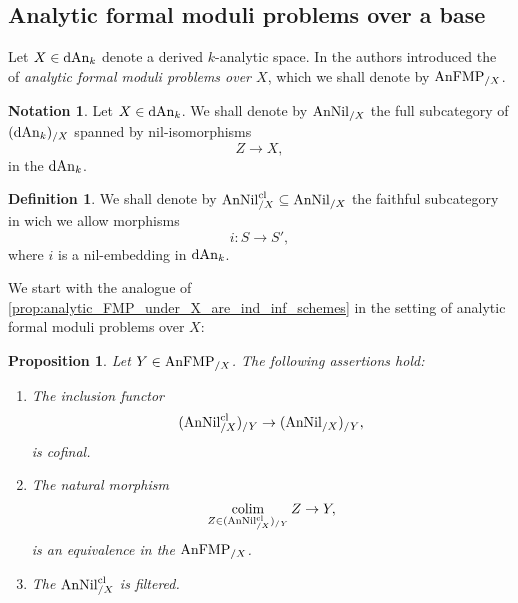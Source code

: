 \documentclass[10pt,a4paper,reqno]{amsart} %
\theoremstyle{plain}
\newtheorem{prop}[thm]{Proposition}
\theoremstyle{definition}
\newtheorem{defin}[thm]{Definition}
\newtheorem{notation}[thm]{Notation}
\theoremstyle{remark}
\numberwithin{equation}{section}
\begin{document}
\subsection{Analytic formal moduli problems over a base}
Let $X \in \mathrm{dAn}_k$ denote a derived $k$-analytic space. In \cite[Definition 6.11]{Porta_Yu_NQK}
the authors introduced the \infcat of \emph{analytic formal moduli problems over $X$}, which we shall denote by $\mathrm{AnFMP}_{/X}$.

\begin{notation}
    Let $X \in \mathrm{dAn}_k$. We shall denote by $\mathrm{AnNil}_{/X}$ the full subcategory of $(\mathrm{dAn}_k)_{/X}$ spanned by nil-isomorphisms
        \[
            Z \to X,
        \]
    in the \infcat $\mathrm{dAn}_k$.
\end{notation}

\begin{defin}
    We shall denote by $\mathrm{AnNil}_{/X}^{\mathrm{cl}} \subseteq \mathrm{AnNil}_{/X}$ the faithful subcategory in wich we allow morphisms
        \[
            i \colon S \to S'  ,
        \]
    where $i$ is a nil-embedding in $\mathrm{dAn}_k$.
\end{defin}

We start with the analogue of \cref{prop:analytic_FMP_under_X_are_ind_inf_schemes} in the setting of analytic formal moduli problems over $X$:

\begin{prop} \label{prop:required_conditions_for_formal_moduli_problems}
    Let $Y \in \mathrm{AnFMP}_{/X}$. The following assertions hold:
    \begin{enumerate}
        \item The inclusion functor
            \[
                (\mathrm{AnNil}^{\mathrm{cl}}_{/X})_{/Y}  \to (\mathrm{AnNil}_{/X})_{/Y},
            \]
        is cofinal.
        \item The natural morphism
            \[
                \operatorname*{colim}_{Z \in (\mathrm{AnNil}^{\mathrm{cl}}_{/X})_{/Y}}  Z \to Y,
            \]
        is an equivalence in the \infcat $\mathrm{AnFMP}_{/X}$.
        \item The \infcat $\mathrm{AnNil}_{/X}^{\mathrm{cl}}$ is filtered.
    \end{enumerate}
\end{prop}
\end{document}
